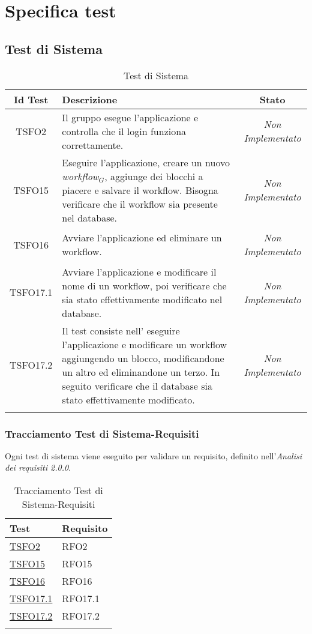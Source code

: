 \chapter{Specifica test}
\label{test}
\section{Test di Sistema}
\normalsize
\begin{longtable}{|c|>{}m{8cm}|c|}
\hline 
\textbf{Id Test} & \textbf{Descrizione} & \textbf{Stato}\\
\hline
\endhead
\hypertarget{TSFO2}{TSFO2} & Il gruppo esegue l'applicazione e controlla che il login funziona correttamente. & \textit{Non Implementato}\\ \hline
\hypertarget{TSFO15}{TSFO15} & Eseguire l'applicazione, creare un nuovo \textit{workflow$_{G}$}, aggiunge dei blocchi a piacere e salvare il workflow. Bisogna verificare che il workflow sia presente nel database. & \textit{Non Implementato}\\ \hline
\hypertarget{TSFO16}{TSFO16} & Avviare l'applicazione ed eliminare un workflow. & \textit{Non Implementato}\\ \hline
\hypertarget{TSFO17.1}{TSFO17.1} & Avviare l'applicazione e modificare il nome di un workflow, poi verificare che sia stato effettivamente modificato nel database. & \textit{Non Implementato}\\ \hline
\hypertarget{TSFO17.2}{TSFO17.2} & Il test consiste nell' eseguire l'applicazione e modificare un workflow aggiungendo un blocco, modificandone un altro ed eliminandone un terzo. In seguito verificare che il database sia stato effettivamente modificato. & \textit{Non Implementato}\\ \hline
\caption[Test di Sistema]{Test di Sistema}
\label{tabella:test1}
\end{longtable}
\clearpage
\subsection{Tracciamento Test di Sistema-Requisiti}
Ogni test di sistema viene eseguito per validare un requisito, definito nell'\textit{Analisi dei requisiti 2.0.0}.
\normalsize
\begin{longtable}{|>{\centering}m{5cm}|m{5cm}<{\centering}|}
\hline
\textbf{Test} & \textbf{Requisito}\\
\hline
\endhead
\hyperlink{TSFO2}{TSFO2} & RFO2\\ \hline
\hyperlink{TSFO15}{TSFO15} & RFO15\\ \hline
\hyperlink{TSFO16}{TSFO16} & RFO16\\ \hline
\hyperlink{TSFO17.1}{TSFO17.1} & RFO17.1\\ \hline
\hyperlink{TSFO17.2}{TSFO17.2} & RFO17.2\\ \hline
\caption[Tracciamento Test di Sistema-Requisiti]{Tracciamento Test di Sistema-Requisiti}
\label{tabella:ts-requi}
\end{longtable}

